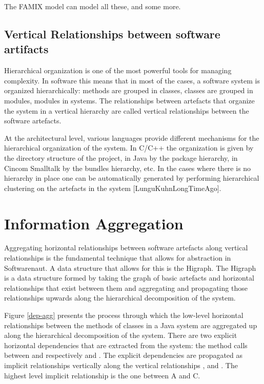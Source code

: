\documentclass[preprint,12pt]{elsarticle}
\begin{document}
The FAMIX model can model all these, and some more.


\subsection {Vertical Relationships between software artifacts}

Hierarchical organization is one of the most powerful tools for managing complexity. In software this means that in most of the cases, a software system is organized hierarchically: methods are grouped in classes, classes are grouped in modules, modules in systems. The relationships between artefacts that organize the system in a vertical hierarchy are called vertical relationships between the software artefacts. 

At the architectural level, various languages provide different mechanisms for the hierarchical organization of the system. In C/C++ the organization is given by the directory structure of the project, in Java by the package hierarchy, in Cincom Smalltalk by the bundles hierarchy, etc. In the cases where there is no hierarchy in place one can be automatically generated by performing hierarchical clustering on the artefacts in the system [LunguKuhnLongTimeAgo]. 



\newpage
\section {Information Aggregation}
\label{sec:org}

Aggregating horizontal relationships between software artefacts along vertical relationships is the fundamental technique that allows for abstraction in Softwarenaut. A data structure that allows for this is the Higraph\cite{harel-visform}. The Higraph is a data structure formed by taking the graph of basic artefacts and horizontal relationships that exist between them and aggregating and propagating those relationships upwards along the hierarchical decomposition of the system. 

Figure \ref{dep-agg} presents the process through which the low-level horizontal relationships between the methods of classes in a Java system are aggregated up along the hierarchical decomposition of the system. There are two explicit horizontal dependencies that are extracted from the system: the method calls between  and respectively  and . 
The explicit dependencies are propagated as implicit relationships vertically along the vertical relationships ,  and . The highest level implicit relationship is the one between A and C. 
\end{document}
